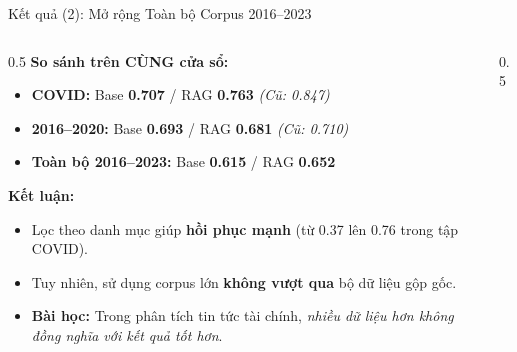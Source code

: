 \documentclass[aspectratio=169, 10pt]{beamer}
\begin{document}
\begin{frame}{Kết quả (2): Mở rộng Toàn bộ Corpus 2016–2023}
    \begin{columns}
        \begin{column}{0.5\textwidth}
            \textbf{So sánh trên CÙNG cửa sổ:}
            \begin{itemize}
                \item \textbf{COVID:} Base \textbf{0.707} / RAG \textbf{0.763} \textit{(Cũ: 0.847)}
                \item \textbf{2016–2020:} Base \textbf{0.693} / RAG \textbf{0.681} \textit{(Cũ: 0.710)}
                \item \textbf{Toàn bộ 2016–2023:} Base \textbf{0.615} / RAG \textbf{0.652}
            \end{itemize}
            \vspace{0.3cm}
            \textbf{Kết luận:}
            \begin{itemize}
                \item Lọc theo danh mục giúp \textbf{hồi phục mạnh} (từ 0.37 lên 0.76 trong tập COVID).
                \item Tuy nhiên, sử dụng corpus lớn \textbf{không vượt qua} bộ dữ liệu gộp gốc.
                \item \textbf{Bài học:} Trong phân tích tin tức tài chính, \textit{nhiều dữ liệu hơn không đồng nghĩa với kết quả tốt hơn}.
            \end{itemize}
        \end{column}
        \begin{column}{0.5\textwidth}
            \centering
        \end{column}
    \end{columns}
\end{frame}
\end{document}
